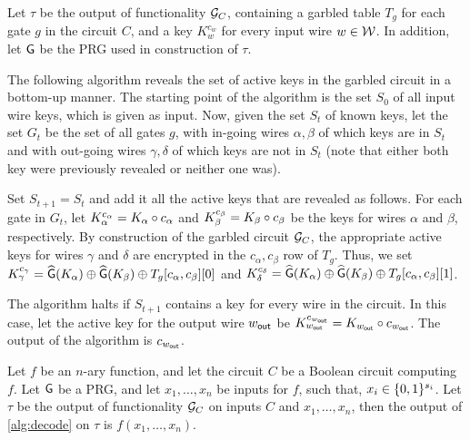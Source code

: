 \begin{algorithm}\label{alg:decode}
Let $\tau$ be the output of functionality $\GC$, containing a garbled table $T_g$ for each gate $g$ in the circuit $C$, and a key $K_w^{c_w}$ for every input wire $w\in{\cal W}$.
In addition, let $\mathsf{G}$ be the PRG used in construction of $\tau$.

The following algorithm reveals the set of active keys in the garbled circuit in a bottom-up manner. The starting point of the algorithm is the set $S_0$ of all input wire keys, which is given as input. Now, given the set $S_t$ of known keys, let the set $G_t$ be the set of all gates $g$, with in-going wires $\alpha,\beta$ of which keys are in $S_t$ and with out-going wires $\gamma,\delta$ of which keys are not in $S_t$ (note that either both key were previously revealed or neither one was).

Set $S_{t+1}=S_t$ and add it all the active keys that are revealed as follows. For each gate in $G_t$, let $K_\alpha^{c_\alpha} = K_\alpha \circ {c_\alpha}$ and $K_\beta^{c_\beta } = K_\beta  \circ {c_\beta }$ be the keys for wires $\alpha$ and $\beta$, respectively. By construction of the garbled circuit $\mathcal{G}_C$, the appropriate active keys for wires $\gamma$ and $\delta$ are encrypted in the $c_\alpha,c_\beta$ row of $T_g$. Thus, we set $K_\gamma^{c_\gamma} = \widehat{\mathsf{G}}(K_\alpha)\oplus \widehat{\mathsf{G}}(K_\beta)\oplus T_g[c_\alpha,c_\beta][0]$ and $K_\delta^{c_\delta} = \widehat{\mathsf{G}}(K_\alpha)\oplus \widehat{\mathsf{G}}(K_\beta)\oplus T_g[c_\alpha,c_\beta][1]$. 

The algorithm halts if $S_{t+1}$ contains a key for every wire in the circuit. In this case, let the active key for the output wire ${w_{\mathsf{out}}}$ be $K_{w_{\mathsf{out}}}^{c_{w_{\mathsf{out}}}} = K_{w_{\mathsf{out}}} \circ {c_{w_{\mathsf{out}}}}$. The output of the algorithm is ${c_{w_{\mathsf{out}}}}$.
\end{algorithm}

\begin{lemma}[correctness of $\GC$]\label{lem:gcCorrect}
Let $f$ be an $n$-ary function, and let the circuit $C$ be a Boolean circuit computing $f$. Let $\mathsf{G}$ be a PRG, and let $x_1,\ldots,x_n$ be inputs for $f$, such that, $x_i\in \{0,1\}^{s_i}$. 
Let $\tau$ be the output of functionality $\GC$ on inputs $C$ and $x_1,\ldots,x_n$, then the output of \cref{alg:decode} on $\tau$ is $f(x_1,\ldots,x_n)$. 
\end{lemma}

